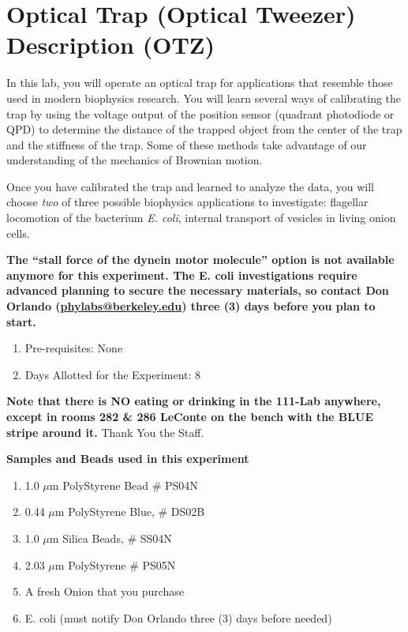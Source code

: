 \documentclass{../lab}
\begin{document}
\maketitle

\tableofcontents

\section{Optical Trap (Optical Tweezer) Description (OTZ)}

In this lab, you will operate an optical trap for applications that resemble those used in modern biophysics research. You will learn several ways of calibrating the trap by using the voltage output of the position sensor (quadrant photodiode or QPD) to determine the distance of the trapped object from the center of the trap and the stiffness of the trap. Some of these methods take advantage of our understanding of the mechanics of Brownian motion.

Once you have calibrated the trap and learned to analyze the data, you will choose \emph{two} of three possible biophysics applications to investigate: flagellar locomotion of the bacterium \emph{E. coli}, internal transport of vesicles in living onion cells.

\textbf{The ``stall force of the dynein motor molecule'' option is not available anymore for this experiment. The E. coli  investigations require advanced planning to secure the necessary materials, so contact Don Orlando (\href{\MailDonOrlando}{\textbf{phylabs@berkeley.edu}}) three (3) days before you plan to start.}

\begin{enumerate}
    \item Pre-requisites: None

    \item Days Allotted for the Experiment: 8
\end{enumerate}

\textbf{Note that there is NO eating or drinking in the 111-Lab anywhere, except in rooms 282 \& 286 LeConte on the bench with the BLUE stripe around it.} Thank You the Staff.

\textbf{Samples and Beads used in this experiment}

\begin{enumerate}
    \item 1.0 $\mu$m PolyStyrene Bead \# PS04N

    \item 0.44 $\mu$m PolyStyrene Blue, \# DS02B

    \item 1.0 $\mu$m Silica Beads, \# SS04N

    \item 2.03 $\mu$m PolyStyrene \# PS05N

    \item A fresh Onion that you purchase

    \item E. coli (must notify Don Orlando three (3) days before needed)
\end{enumerate}
\end{document}
